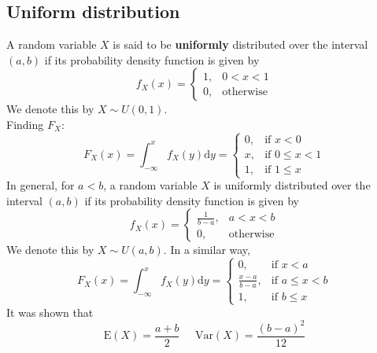 \documentclass[12pt]{article}
\newcommand{\diff}{\mathrm{d}}
\newcommand{\var}{\mathrm{Var}}
\newcommand{\expec}{\mathrm{E}}
\theoremstyle{definition}
\begin{document}
\subsection{Uniform distribution}
A random variable $X$ is said to be \textbf{uniformly} distributed over the interval $(a,b)$ if its probability density function is given by
\[
f_X(x)=\begin{cases}
1,&0<x<1\\
0, &\text{otherwise}
\end{cases}
\]
We denote this by $X\sim U(0,1)$.\\
Finding $F_X$:
\[
F_X(x) = \int_{-\infty}^xf_X(y)\diff y=\begin{cases}
0,&\text{if }x<0\\
x,&\text{if }0\leq x<1\\
1,&\text{if }1\leq x
\end{cases}
\]
In general, for $a<b$, a random variable $X$ is uniformly distributed over the interval $(a,b)$ if its probability density function is given by
\[
f_X(x)=\begin{cases}
\frac{1}{b-a},&a<x<b\\
0, &\text{otherwise}
\end{cases}
\]
We denote this by $X\sim U(a,b)$.
In a similar way,
\[
F_X(x)=\int_{-\infty}^xf_X(y)\diff y = \begin{cases}
0,&\text{if }x<a\\
\frac{x-a}{b-a},&\text{if }a\leq x<b\\
1,&\text{if }b\leq x
\end{cases}
\]
It was shown that
\[
\expec(X)=\frac{a+b}{2}\;\;\;\;\;\var(X)=\frac{(b-a)^2}{12}
\]
\end{document}
